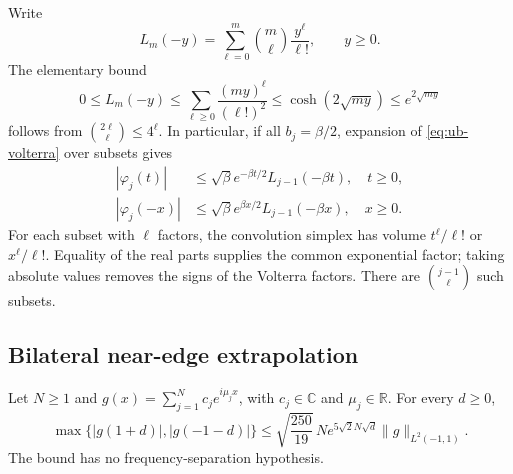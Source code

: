 Write
\[
 L_m(-y)=\sum_{\ell=0}^m\binom m\ell\frac{y^\ell}{\ell!},
 \qquad y\ge0.
\]
The elementary bound
\begin{equation}\label{eq:ub-laguerre}
 0\le L_m(-y)
 \le\sum_{\ell\ge0}\frac{(my)^\ell}{(\ell!)^2}
 \le\cosh(2\sqrt{my})\le e^{2\sqrt{my}}
\end{equation}
follows from $\binom{2\ell}{\ell}\le4^\ell$.  In particular, if all
$b_j=\beta/2$, expansion of \eqref{eq:ub-volterra} over subsets gives
\begin{equation}\label{eq:ub-basis-majorants}
 \begin{split}
 |\varphi_j(t)|&\le\sqrt\beta e^{-\beta t/2}
                         L_{j-1}(-\beta t),\quad t\ge0,\\
 |\varphi_j(-x)|&\le\sqrt\beta e^{\beta x/2}
                         L_{j-1}(-\beta x),\quad x\ge0.
 \end{split}
\end{equation}
For each subset with $\ell$ factors, the convolution simplex has volume
$t^\ell/\ell!$ or $x^\ell/\ell!$.  Equality of the real parts supplies
the common exponential factor; taking absolute values removes the signs
of the Volterra factors.  There are $\binom{j-1}{\ell}$ such subsets.

\subsection{Bilateral near-edge extrapolation}

\begin{theorem}\label{thm:ub-edge}
Let $N\ge1$ and
$g(x)=\sum_{j=1}^N c_je^{i\mu_jx}$, with $c_j\in\mathbb C$ and
$\mu_j\in\mathbb R$.  For every $d\ge0$,
\begin{equation}\label{eq:ub-edge}
 \max\{|g(1+d)|,|g(-1-d)|\}
 \le \sqrt{\frac{250}{19}}\,N
       e^{5\sqrt2N\sqrt d}\|g\|_{L^2(-1,1)}.
\end{equation}
The bound has no frequency-separation hypothesis.
\end{theorem}

